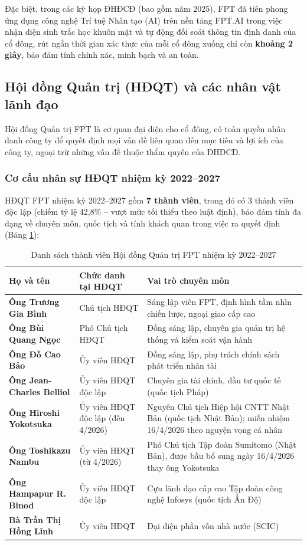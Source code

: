 Đặc biệt, trong các kỳ họp ĐHĐCĐ (bao gồm năm 2025), FPT đã tiên phong ứng dụng công nghệ Trí tuệ Nhân tạo (AI) trên nền tảng FPT.AI trong việc nhận diện sinh trắc học khuôn mặt và tự động đối soát thông tin định danh của cổ đông, rút ngắn thời gian xác thực của mỗi cổ đông xuống chỉ còn \textbf{khoảng 2 giây}, bảo đảm tính chính xác, minh bạch và an toàn.

\subsection{Hội đồng Quản trị (HĐQT) và các nhân vật lãnh đạo}
Hội đồng Quản trị FPT là cơ quan đại diện cho cổ đông, có toàn quyền nhân danh công ty để quyết định mọi vấn đề liên quan đến mục tiêu và lợi ích của công ty, ngoại trừ những vấn đề thuộc thẩm quyền của ĐHĐCĐ.

\subsubsection{Cơ cấu nhân sự HĐQT nhiệm kỳ 2022--2027}
HĐQT FPT nhiệm kỳ 2022--2027 gồm \textbf{7 thành viên}, trong đó có 3 thành viên độc lập (chiếm tỷ lệ 42,8\% -- vượt mức tối thiểu theo luật định), bảo đảm tính đa dạng về chuyên môn, quốc tịch và tính khách quan trong việc ra quyết định (Bảng \ref{tab:hdqt_fpt}):

\begin{table}[htbp]
\centering
\caption{Danh sách thành viên Hội đồng Quản trị FPT nhiệm kỳ 2022--2027}
\label{tab:hdqt_fpt}
\begin{tabularx}{\textwidth}{p{4.2cm} p{4.5cm} X}
\toprule
\textbf{Họ và tên} & \textbf{Chức danh tại HĐQT} & \textbf{Vai trò chuyên môn} \\
\midrule
\textbf{Ông Trương Gia Bình} & Chủ tịch HĐQT & Sáng lập viên FPT, định hình tầm nhìn chiến lược, ngoại giao cấp cao \\
\textbf{Ông Bùi Quang Ngọc} & Phó Chủ tịch HĐQT & Đồng sáng lập, chuyên gia quản trị hệ thống và kiểm soát vận hành \\
\textbf{Ông Đỗ Cao Bảo} & Ủy viên HĐQT & Đồng sáng lập, phụ trách chính sách phát triển nhân tài \\
\textbf{Ông Jean-Charles Belliol} & Ủy viên HĐQT độc lập & Chuyên gia tài chính, đầu tư quốc tế (quốc tịch Pháp) \\
\textbf{Ông Hiroshi Yokotsuka} & Ủy viên HĐQT độc lập (đến 4/2026) & Nguyên Chủ tịch Hiệp hội CNTT Nhật Bản (quốc tịch Nhật Bản); miễn nhiệm 16/4/2026 theo nguyện vọng cá nhân \\
\textbf{Ông Toshikazu Nambu} & Ủy viên HĐQT (từ 4/2026) & Phó Chủ tịch Tập đoàn Sumitomo (Nhật Bản), được bầu bổ sung ngày 16/4/2026 thay ông Yokotsuka \\
\textbf{Ông Hampapur R. Binod} & Ủy viên HĐQT độc lập & Cựu lãnh đạo cấp cao Tập đoàn công nghệ Infosys (quốc tịch Ấn Độ) \\
\textbf{Bà Trần Thị Hồng Lĩnh} & Ủy viên HĐQT & Đại diện phần vốn nhà nước (SCIC) \\
\bottomrule
\end{tabularx}
\end{table}

